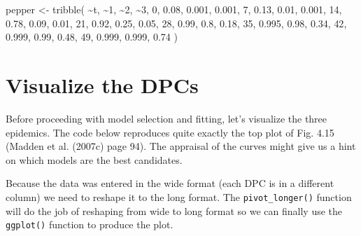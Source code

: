 \documentclass[
  letterpaper,
]{book}
\newenvironment{Shaded}{\begin{snugshade}}{\end{snugshade}}
\newcommand{\AttributeTok}[1]{\textcolor[rgb]{0.40,0.45,0.13}{#1}}
\newcommand{\DecValTok}[1]{\textcolor[rgb]{0.68,0.00,0.00}{#1}}
\newcommand{\FloatTok}[1]{\textcolor[rgb]{0.68,0.00,0.00}{#1}}
\newcommand{\FunctionTok}[1]{\textcolor[rgb]{0.28,0.35,0.67}{#1}}
\newcommand{\NormalTok}[1]{\textcolor[rgb]{0.00,0.23,0.31}{#1}}
\newcommand{\OtherTok}[1]{\textcolor[rgb]{0.00,0.23,0.31}{#1}}
\newcommand{\SpecialCharTok}[1]{\textcolor[rgb]{0.37,0.37,0.37}{#1}}
\newcommand{\StringTok}[1]{\textcolor[rgb]{0.13,0.47,0.30}{#1}}
\begin{document}
\begin{Shaded}
\begin{Highlighting}[]
\NormalTok{pepper }\OtherTok{\textless{}{-}} 
  \FunctionTok{tribble}\NormalTok{(}
   \SpecialCharTok{\textasciitilde{}}\NormalTok{t,  }\SpecialCharTok{\textasciitilde{}}\StringTok{\textasciigrave{}}\AttributeTok{1}\StringTok{\textasciigrave{}}\NormalTok{,  }\SpecialCharTok{\textasciitilde{}}\StringTok{\textasciigrave{}}\AttributeTok{2}\StringTok{\textasciigrave{}}\NormalTok{,  }\SpecialCharTok{\textasciitilde{}}\StringTok{\textasciigrave{}}\AttributeTok{3}\StringTok{\textasciigrave{}}\NormalTok{,}
   \DecValTok{0}\NormalTok{,  }\FloatTok{0.08}\NormalTok{, }\FloatTok{0.001}\NormalTok{, }\FloatTok{0.001}\NormalTok{,}
   \DecValTok{7}\NormalTok{,  }\FloatTok{0.13}\NormalTok{,  }\FloatTok{0.01}\NormalTok{, }\FloatTok{0.001}\NormalTok{,}
  \DecValTok{14}\NormalTok{,  }\FloatTok{0.78}\NormalTok{,  }\FloatTok{0.09}\NormalTok{,  }\FloatTok{0.01}\NormalTok{,}
  \DecValTok{21}\NormalTok{,  }\FloatTok{0.92}\NormalTok{,  }\FloatTok{0.25}\NormalTok{,  }\FloatTok{0.05}\NormalTok{,}
  \DecValTok{28}\NormalTok{,  }\FloatTok{0.99}\NormalTok{,   }\FloatTok{0.8}\NormalTok{,  }\FloatTok{0.18}\NormalTok{,}
  \DecValTok{35}\NormalTok{, }\FloatTok{0.995}\NormalTok{,  }\FloatTok{0.98}\NormalTok{,  }\FloatTok{0.34}\NormalTok{,}
  \DecValTok{42}\NormalTok{, }\FloatTok{0.999}\NormalTok{,  }\FloatTok{0.99}\NormalTok{,  }\FloatTok{0.48}\NormalTok{,}
  \DecValTok{49}\NormalTok{, }\FloatTok{0.999}\NormalTok{, }\FloatTok{0.999}\NormalTok{,  }\FloatTok{0.74}
\NormalTok{  ) }
\end{Highlighting}
\end{Shaded}

\hypertarget{visualize-the-dpcs}{%
\section{Visualize the DPCs}\label{visualize-the-dpcs}}

Before proceeding with model selection and fitting, let's visualize the
three epidemics. The code below reproduces quite exactly the top plot of
Fig. 4.15 (Madden et al. (2007c) page 94). The appraisal of the curves
might give us a hint on which models are the best candidates.

Because the data was entered in the wide format (each DPC is in a
different column) we need to reshape it to the long format. The
\texttt{pivot\_longer()} function will do the job of reshaping from wide
to long format so we can finally use the \texttt{ggplot()} function to
produce the plot.
\end{document}
